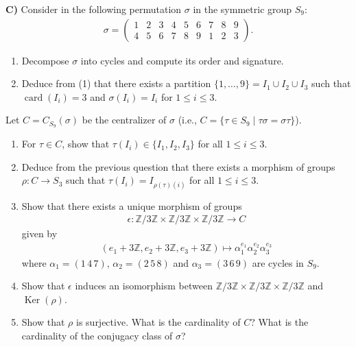 \documentclass[12pt,a4paper]{article}
\begin{document}
\newpage
\noindent\textbf{C)} Consider in the following permutation $\sigma$ in the symmetric group $S_9$:
\begin{align*}
\sigma=\begin{pmatrix}
1&2&3&4&5&6&7&8&9\\
4&5&6&7&8&9&1&2&3
\end{pmatrix}.
\end{align*}
\begin{enumerate}
\renewcommand{\labelenumi}{(\arabic{enumi})}
\item Decompose $\sigma$ into cycles and compute its order and signature.
\item Deduce from (1) that there exists a partition $\{1,\ldots,9\}=I_1\cup I_2\cup I_3$ such that $\operatorname{card}(I_i)=3$ and $\sigma(I_i)=I_i$ for $1\leq i\leq 3$.
\end{enumerate}
\noindent Let $C=C_{S_9}(\sigma)$ be the centralizer of $\sigma$ (i.e., $C=\{\tau\in S_9\mid\tau\sigma=\sigma\tau\}$).
\begin{enumerate}
\renewcommand{\labelenumi}{(\arabic{enumi})}
\setcounter{enumi}{2}
\item For $\tau\in C$, show that $\tau(I_i)\in\{I_1,I_2,I_3\}$ for all $1\leq i\leq 3$.
\item Deduce from the previous question that there exists a morphism of groups $\rho\colon C\to S_3$ such that $\tau(I_i)=I_{\rho(\tau)(i)}$ for all $1\leq i\leq 3$.
\item Show that there exists a unique morphism of groups
\begin{align*}
\epsilon\colon\mathbb{Z}/3\mathbb{Z}\times\mathbb{Z}/3\mathbb{Z}\times\mathbb{Z}/3\mathbb{Z}\to C
\end{align*}
given by
\begin{align*}
(e_1+3\mathbb{Z},e_2+3\mathbb{Z},e_3+3\mathbb{Z})\mapsto\alpha_1^{e_1}\alpha_2^{e_2}\alpha_3^{e_3}
\end{align*}
where $\alpha_1=(1\,4\,7)$, $\alpha_2=(2\,5\,8)$ and $\alpha_3=(3\,6\,9)$ are cycles in $S_9$.
\item Show that $\epsilon$ induces an isomorphism between $\mathbb{Z}/3\mathbb{Z}\times\mathbb{Z}/3\mathbb{Z}\times\mathbb{Z}/3\mathbb{Z}$ and $\operatorname{Ker}(\rho)$.
\item Show that $\rho$ is surjective. What is the cardinality of $C$? What is the cardinality of the conjugacy class of $\sigma$?
\end{enumerate}
\end{document}
